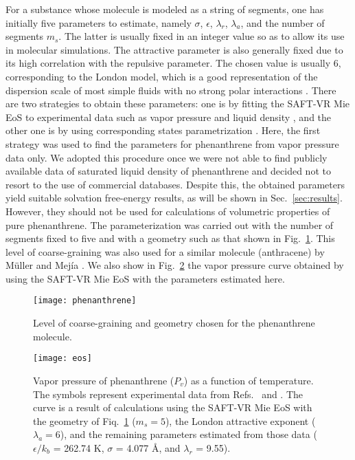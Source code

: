 \documentclass[preprint]{elsarticle}
\begin{document}
	For a substance whose molecule is modeled as a string of segments, one has initially five parameters to estimate, namely $\sigma$, $\epsilon$, $\lambda_r$, $\lambda_a$, and the number of segments $m_s$. The latter is usually fixed in an integer value so as to allow its use in molecular simulations. The attractive parameter is also generally fixed due to its high correlation with the repulsive parameter. The chosen value is usually $6$, corresponding to the London model, which is a good representation of the dispersion scale of most simple fluids with no strong polar interactions \cite{ramrattan2015,herdes2015}. There are two strategies to obtain these parameters: one is by fitting the SAFT-VR Mie EoS to experimental data such as vapor pressure and liquid density \cite{avendano2013}, and the other one is by using corresponding states parametrization \cite{mejia2014, muller2017}. Here, the first strategy was used to find the parameters for phenanthrene from vapor pressure data \cite{murphy,osborn} only. We adopted this procedure once we were not able to find publicly available data of saturated liquid density of phenanthrene and decided not to resort to the use of commercial databases. Despite this, the obtained parameters yield suitable solvation free-energy results, as will be shown in Sec.~\ref{sec:results}. However, they should not be used for calculations of volumetric properties of pure phenanthrene. The parameterization was carried out with the number of segments fixed to five and with a geometry such as that shown in Fig.~\ref{fig:fen5}. This level of coarse-graining was also used for a similar molecule (anthracene) by M\"{u}ller and Mej\'{i}a \cite{muller2017}. We also show in Fig.~\ref{fig:edefit} the vapor pressure curve obtained by using the SAFT-VR Mie EoS with the parameters estimated here.
	
	\begin{figure}
		\texttt{[image: phenanthrene]}
		\caption{Level of coarse-graining and geometry chosen for the phenanthrene molecule.}
		\label{fig:fen5}
	\end{figure}
	
	\begin{figure}
		\texttt{[image: eos]}
		\caption{Vapor pressure of phenanthrene ($P_{v}$) as a function of temperature. The symbols represent experimental data from Refs.~ and . The curve is a result of calculations using the SAFT-VR Mie EoS with the geometry of Fiq.~\ref{fig:fen5} ($m_s = 5$), the London attractive exponent ($\lambda_a = 6$), and the remaining parameters estimated from those data ($\epsilon/k_b$ = 262.74 K, $\sigma$ = 4.077 \AA, and $\lambda_r$ = 9.55).}
		\label{fig:edefit}
	\end{figure}
	
\end{document}
